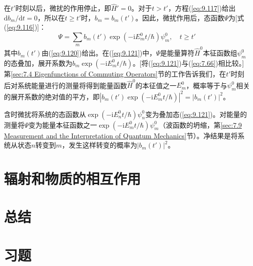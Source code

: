     在$t'$时刻以后，微扰的作用停止，即$\hat{H}'=0$。对于$t > t'$，方程(\ref{eq:9.117})给出$\mathrm{d}b_m /\mathrm{d}t = 0$，所以在$t \geq t'$时，$b_m = b_m\left(t'\right)$。因此，微扰作用后，态函数$\Psi$为[式(\ref{eq:9.116})]：
    \begin{equation}
        \Psi = \sum_mb_m\left(t'\right)\exp\left(-\mathrm{i}E_m^0t/\hbar\right)\psi_m^0, \quad t \geq t'
        \label{eq:9.121}
    \end{equation}
    其中$b_m\left(t'\right)$由(\ref{eq:9.120})给出。在(\ref{eq:9.121})中，$\Psi$是能量算符$\hat{H}^0$本征函数组$\psi_m^0$的态叠加，展开系数为$b_m\exp\left(-\mathrm{i}E_m^0t/\hbar\right)$。[将(\ref{eq:9.121})与(\ref{eq:7.66})相比较。]第\ref{sec:7.4 Eigenfunctions of Commuting Operators}节的工作告诉我们，在$t'$时刻后对系统能量进行的测量将得到能量函数$\hat{H}^0$的本征值之一$E_m^0$，概率等于与$\psi_m^0$相关的展开系数的绝对值的平方，即$\left|b_m\left(t'\right)\exp\left(-\mathrm{i}E_m^0t/\hbar\right)\right|^2 = \left|b_m\left(t'\right)\right|^2$。
    
    含时微扰将系统的态函数从$\exp\left(-\mathrm{i}E_n^0t/\hbar\right)\psi_n^0$变为叠加态(\ref{eq:9.121})。对能量的测量将$\Psi$变为能量本征函数之一$\exp\left(-\mathrm{i}E_m^0t/\hbar\right)\psi_m^0$（波函数的坍缩，第\ref{sec:7.9 Measurement and the Interpretation of Quantum Mechanics}节）。净结果是将系统从状态$n$转变到$m$，发生这样转变的概率为$\left|b_m\left(t'\right)\right|^2$。

\section{辐射和物质的相互作用}
\label{sec:9.9 Interaction of Radiation and Matter}




















\section*{总结}

\section*{习题}